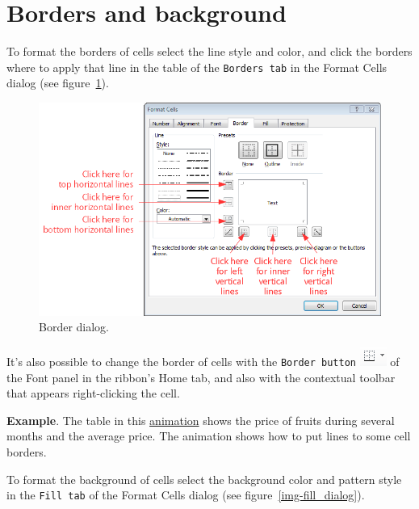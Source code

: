 \section{Borders and background}\hypertarget{borders-and-background}{}\label{borders-and-background}

To format the borders of cells select the line style and color, and click the borders where to apply that line in the
table of the \texttt{Borders tab} in the Format Cells dialog (see figure~\ref{img-border_dialog}).

\begin{figure}[htbp]
\begin{center}
\includegraphics[scale=0.7]{../img/border_dialog.png}
\end{center}
\caption{Border dialog.}
\label{img-border_dialog}
\end{figure}

It's also possible to change the border of cells with the \texttt{Border button}
\includegraphics[scale=0.7]{../img/button_border.png} of the Font panel in the ribbon's Home tab, and also with the
contextual toolbar that appears right-clicking the cell.

\textbf{Example}. The table in this
\href{http://aprendeconalf.es/office/excel/manual/img/example_borders.gif}{animation} shows the price of fruits during several months and the average price. The animation shows how to put lines to some cell borders.

To format the background of cells select the background color and pattern style in the \texttt{Fill tab} of the Format
Cells dialog (see figure~\ref{img-fill_dialog}).

